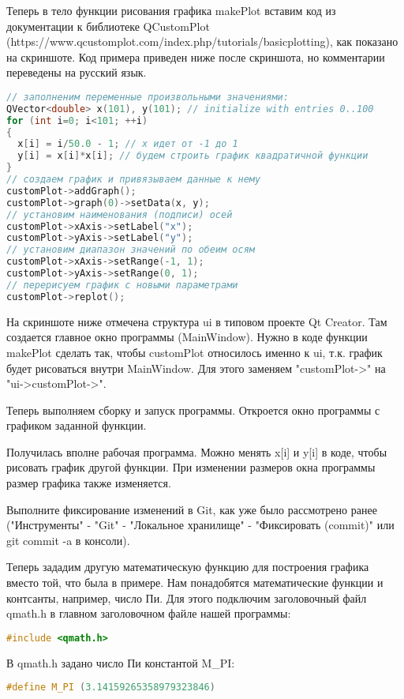 Теперь в тело функции рисования графика makePlot вставим код из документации к библиотеке QCustomPlot (https://www.qcustomplot.com/index.php/tutorials/basicplotting), как показано на скриншоте. Код примера приведен ниже после скриншота, но комментарии переведены на русский язык.

\begin{lstlisting}[language=c++]
// заполненим переменные произвольными значениями:
QVector<double> x(101), y(101); // initialize with entries 0..100
for (int i=0; i<101; ++i)
{
  x[i] = i/50.0 - 1; // x идет от -1 до 1
  y[i] = x[i]*x[i]; // будем строить график квадратичной функции
}
// создаем график и привязываем данные к нему
customPlot->addGraph();
customPlot->graph(0)->setData(x, y);
// установим наименования (подписи) осей
customPlot->xAxis->setLabel("x");
customPlot->yAxis->setLabel("y");
// установим диапазон значений по обеим осям
customPlot->xAxis->setRange(-1, 1);
customPlot->yAxis->setRange(0, 1);
// перерисуем график с новыми параметрами
customPlot->replot();
\end{lstlisting}

На скриншоте ниже отмечена структура ui в типовом проекте Qt Creator. Там создается главное окно программы (MainWindow). Нужно в коде функции makePlot сделать так, чтобы customPlot относилось именно к ui, т.к. график будет рисоваться внутри MainWindow. Для этого заменяем "customPlot->" на "ui->customPlot->".

Теперь выполняем сборку и запуск программы. Откроется окно программы с графиком заданной функции.

Получилась вполне рабочая программа. Можно менять x[i] и y[i] в коде, чтобы рисовать график другой функции. При изменении размеров окна программы размер графика также изменяется.

Выполните фиксирование изменений в Git, как уже было рассмотрено ранее ("Инструменты" - "Git" - "Локальное хранилище" - "Фиксировать (commit)" или git commit -a в консоли).

Теперь зададим другую математическую функцию для построения графика вместо той, что была в примере. Нам понадобятся математические функции и контсанты, например, число Пи. Для этого подключим заголовочный файл qmath.h в главном заголовочном файле нашей программы:
\begin{lstlisting}[language=c++]
#include <qmath.h>
\end{lstlisting}

В qmath.h задано число Пи константой M_PI:
\begin{lstlisting}[language=c++]
#define M_PI (3.14159265358979323846)
\end{lstlisting}

\clearpage
